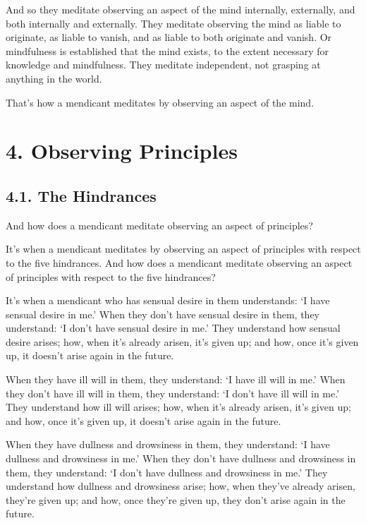 \documentclass[12pt,openany]{book}%
\begin{document}
And so they meditate observing an aspect of the mind internally, externally, and both internally and externally. They meditate observing the mind as liable to originate, as liable to vanish, and as liable to both originate and vanish. Or mindfulness is established that the mind exists, to the extent necessary for knowledge and mindfulness. They meditate independent, not grasping at anything in the world. 

That’s how a mendicant meditates by observing an aspect of the mind. 

\section*{4. Observing Principles }

\subsection*{4.1. The Hindrances }

And how does a mendicant meditate observing an aspect of principles? 

It’s when a mendicant meditates by observing an aspect of principles with respect to the five hindrances. And how does a mendicant meditate observing an aspect of principles with respect to the five hindrances? 

It’s when a mendicant who has sensual desire in them understands: ‘I have sensual desire in me.’ When they don’t have sensual desire in them, they understand: ‘I don’t have sensual desire in me.’ They understand how sensual desire arises; how, when it’s already arisen, it’s given up; and how, once it’s given up, it doesn’t arise again in the future. 

When they have ill will in them, they understand: ‘I have ill will in me.’ When they don’t have ill will in them, they understand: ‘I don’t have ill will in me.’ They understand how ill will arises; how, when it’s already arisen, it’s given up; and how, once it’s given up, it doesn’t arise again in the future. 

When they have dullness and drowsiness in them, they understand: ‘I have dullness and drowsiness in me.’ When they don’t have dullness and drowsiness in them, they understand: ‘I don’t have dullness and drowsiness in me.’ They understand how dullness and drowsiness arise; how, when they’ve already arisen, they’re given up; and how, once they’re given up, they don’t arise again in the future. 
\end{document}
